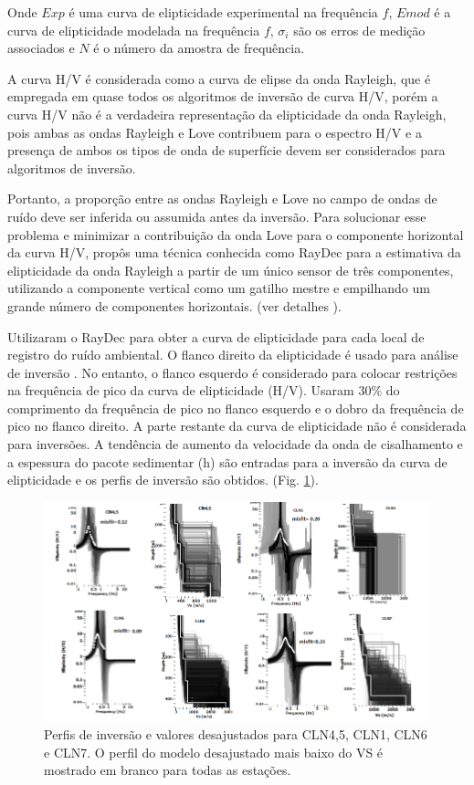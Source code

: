 \documentclass[smallextended]{svjour3}       %
\begin{document}
Onde $Exp$ é uma curva de elipticidade experimental na frequência $f$, $Emod$ é a curva de elipticidade modelada na frequência $f$, $\sigma_i$ são os erros de medição associados e $N$ é o número da amostra de frequência.

A curva H/V é considerada como a curva de elipse da onda Rayleigh, que é empregada em quase todos os algoritmos de inversão de curva H/V, porém a curva H/V não é a verdadeira representação da elipticidade da onda Rayleigh, pois ambas as ondas Rayleigh e Love contribuem para o espectro H/V \citep{bonnefoy2006h} e a presença de ambos os tipos de onda de superfície devem ser considerados para algoritmos de inversão. 

Portanto, a proporção entre as ondas Rayleigh e Love no campo de ondas de ruído deve ser inferida ou assumida antes da inversão. Para solucionar esse problema e minimizar a contribuição da onda Love para o componente horizontal da curva H/V, \cite{hobiger2009single} propôs uma técnica conhecida como RayDec para a estimativa da elipticidade da onda Rayleigh a partir de um único sensor de três componentes, utilizando a componente vertical como um gatilho mestre e empilhando um grande número de componentes horizontais. (ver detalhes \citealp{hobiger2009single}). 

Utilizaram o RayDec para obter a curva de elipticidade para cada local de registro do ruído ambiental. O flanco direito da elipticidade é usado para análise de inversão \citep{hobiger2013ground}. No entanto, o flanco esquerdo é considerado  para colocar restrições na frequência de pico da curva de elipticidade (H/V). Usaram 30\% do comprimento da frequência de pico no flanco esquerdo e o dobro da frequência de pico no flanco direito. A parte restante da curva de elipticidade não é considerada para inversões. A tendência de aumento da velocidade da onda de cisalhamento e a espessura do pacote sedimentar (h) são entradas para a inversão da curva de elipticidade e os perfis de inversão são obtidos. (Fig. \ref{elipticidade}).

\begin{figure}[!hbtp]
  \begin{center}
  
  \includegraphics[scale=0.7]{Figures/fig7.png}
  \end{center}
  \caption{Perfis de inversão e valores desajustados para CLN4,5, CLN1, CLN6 e CLN7. O perfil do modelo desajustado mais baixo do VS é mostrado em branco para todas as estações.}
  \label{elipticidade}
\end{figure}
\newpage
\end{document}
